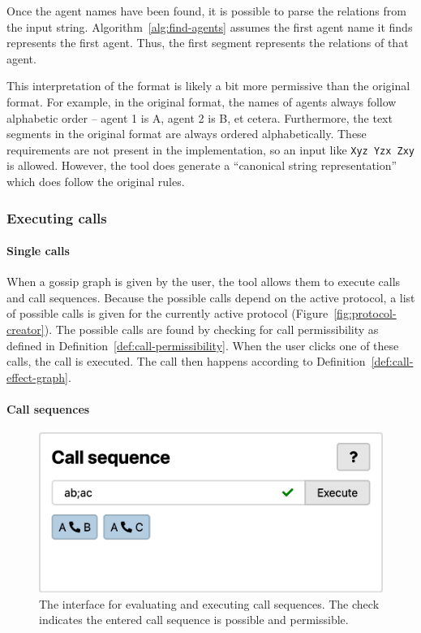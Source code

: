 Once the agent names have been found, it is possible to parse the relations from the input string.
Algorithm~\ref{alg:find-agents} assumes the first agent name it finds represents the first agent. 
Thus, the first segment represents the relations of that agent.

This interpretation of the format is likely a bit more permissive than the original format.
For example, in the original format, the names of agents always follow alphabetic order -- agent 1 is A, agent 2 is B, et cetera.
Furthermore, the text segments in the original format are always ordered alphabetically.
These requirements are not present in the implementation, so an input like \texttt{Xyz Yzx Zxy} is allowed.
However, the tool does generate a ``canonical string representation'' which does follow the original rules.

\subsubsection{Executing calls}
\label{sec:protocol-execution}

\paragraph{Single calls}
\label{sec:call-execution}

When a gossip graph is given by the user, the tool allows them to execute calls and call sequences. 
Because the possible calls depend on the active protocol,
a list of possible calls is given for the currently active protocol (Figure~\ref{fig:protocol-creator}).
The possible calls are found by checking for call permissibility as defined in Definition~\ref{def:call-permissibility}.
When the user clicks one of these calls, the call is executed.
The call then happens according to Definition~\ref{def:call-effect-graph}.

\paragraph{Call sequences}
\label{sec:call-sequence-executiun}

\begin{figure}[htb!]
    \includegraphics[width=\linewidth]{img/call-sequence.png}
    \caption{The interface for evaluating and executing call sequences. The check indicates the entered call sequence is possible and permissible.}
    \label{fig:call-sequence}
\end{figure}

